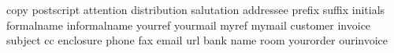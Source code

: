               {copy}
        {postscript}
         {attention}
      {distribution}
        {salutation}
         {addressee}
            {prefix}
            {suffix}
          {initials}
        {formalname}
      {informalname}
           {yourref}
          {yourmail}
             {myref}
            {mymail}
          {customer}
           {invoice}
           {subject}
                {cc}
         {enclosure}
             {phone}
               {fax}
             {email}
               {url}
              {bank}
              {name}
              {room}
         {yourorder}
        {ourinvoice}
\stopinterface

